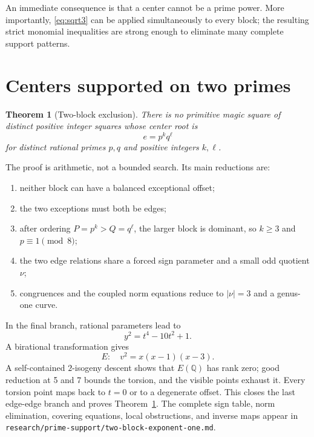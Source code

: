 \documentclass[11pt]{article}
\newtheorem{theorem}{Theorem}[section]
\theoremstyle{definition}
\theoremstyle{remark}
\newcommand{\Q}{\mathbb Q}
\begin{document}
An immediate consequence is that a center cannot be a prime power.  More
importantly, \eqref{eq:sqrt3} can be applied simultaneously to every block;
the resulting strict monomial inequalities are strong enough to eliminate
many complete support patterns.

\section{Centers supported on two primes}

\begin{theorem}[Two-block exclusion]
\label{thm:two}
There is no primitive magic square of distinct positive integer squares whose
center root is
\begin{equation}
e=p^kq^\ell
\end{equation}
for distinct rational primes $p,q$ and positive integers $k,\ell$.
\end{theorem}

The proof is arithmetic, not a bounded search.  Its main reductions are:
\begin{enumerate}[leftmargin=2em]
  \item neither block can have a balanced exceptional offset;
  \item the two exceptions must both be edges;
  \item after ordering $P=p^k>Q=q^\ell$, the larger block is dominant, so
        $k\ge3$ and $p\equiv1\pmod8$;
  \item the two edge relations share a forced sign parameter and a small odd
        quotient $\nu$;
  \item congruences and the coupled norm equations reduce to $|\nu|=3$ and a
        genus-one curve.
\end{enumerate}
In the final branch, rational parameters lead to
\begin{equation}
y^2=t^4-10t^2+1.
\label{eq:quartic-two}
\end{equation}
A birational transformation gives
\begin{equation}
E:\quad v^2=x(x-1)(x-3).
\label{eq:curve-two}
\end{equation}
A self-contained $2$-isogeny descent shows that $E(\Q)$ has rank zero; good
reduction at 5 and 7 bounds the torsion, and the visible points exhaust it.
Every torsion point maps back to $t=0$ or to a degenerate offset.  This closes
the last edge-edge branch and proves Theorem~\ref{thm:two}.  The complete sign
table, norm elimination, covering equations, local obstructions, and inverse
maps appear in
\texttt{research/prime-support/two-block-exponent-one.md}.
\end{document}
